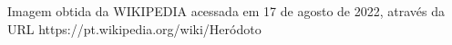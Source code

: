 \documentclass[
12pt,		%
openright,	%
twoside,  %
a4paper,			%
chapter=TITLE,		%
english,			%
french,				%
spanish,			%
brazil				%
]{USPSC-classe/USPSC_RedarTex}
\begin{document}
\begin{flushleft}
\begin{flushleft}
\begin{flushleft}
\begin{flushleft}
\begin{flushleft}
\begin{flushleft}
\begin{flushleft}
\begin{flushleft}
\begin{flushleft}
\begin{flushleft}
[WIKIPEDIA, 2022] Imagem obtida da WIKIPEDIA acessada em 17 de agosto de 2022, atrav\'es da URL https://pt.wikipedia.org/wiki/Her\'odoto
\end{flushleft}


\end{flushleft}


\end{flushleft}


\end{flushleft}


\end{flushleft}


\end{flushleft}


\end{flushleft}


\end{flushleft}


\end{flushleft}


\end{flushleft}
\end{document}
